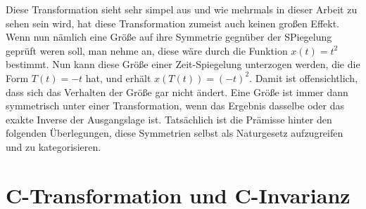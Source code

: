 \documentclass[12pt,a4paper]{scrartcl}
\numberwithin{equation}{section}
\begin{document}
Diese Transformation sieht sehr simpel aus und wie mehrmals in dieser Arbeit zu sehen sein wird, hat diese Transformation zumeist auch keinen großen Effekt. Wenn nun nämlich eine Größe auf ihre Symmetrie gegnüber der SPiegelung geprüft weren soll, man nehme an, diese wäre durch die Funktion $x(t) = t^2$ bestimmt. Nun kann diese Größe einer Zeit-Spiegelung unterzogen werden, die die Form $T(t) = -t$ hat, und erhält $x(T(t)) = (-t)^2$. Damit ist offensichtlich, dass sich das Verhalten der Größe gar nicht ändert. Eine Größe ist immer dann symmetrisch unter einer Transformation, wenn das Ergebnis dasselbe oder das exakte Inverse der Ausgangslage ist. Tatsächlich ist die Prämisse hinter den folgenden Überlegungen, diese Symmetrien selbst als Naturgesetz aufzugreifen und zu kategorisieren.

  \newpage  %

  \section{C-Transformation und C-Invarianz}
\end{document}
